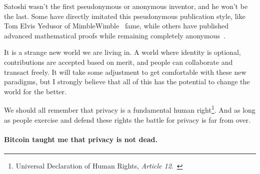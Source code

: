Satoshi wasn't the first pseudonymous or anonymous inventor, and he won't be the
last. Some have directly imitated this pseudonymous publication style, like Tom
Elvis Yedusor of MimbleWimble~\cite{mimblewimble-origin} fame, while others have
published advanced mathematical proofs while remaining completely
anonymous~\cite{4chan-math}.

It is a strange new world we are living in. A world where identity is
optional, contributions are accepted based on merit, and people can
collaborate and transact freely. It will take some adjustment to get
comfortable with these new paradigms, but I strongly believe that all of
this has the potential to change the world for the better.

We should all remember that privacy is a fundamental human right\footnote{Universal Declaration of Human Rights, \textit{Article 12}.~\cite{article12}}. And as long
as people exercise and defend these rights the battle for privacy is far from
over.

\paragraph{Bitcoin taught me that privacy is not dead.}

%
%
%
%
